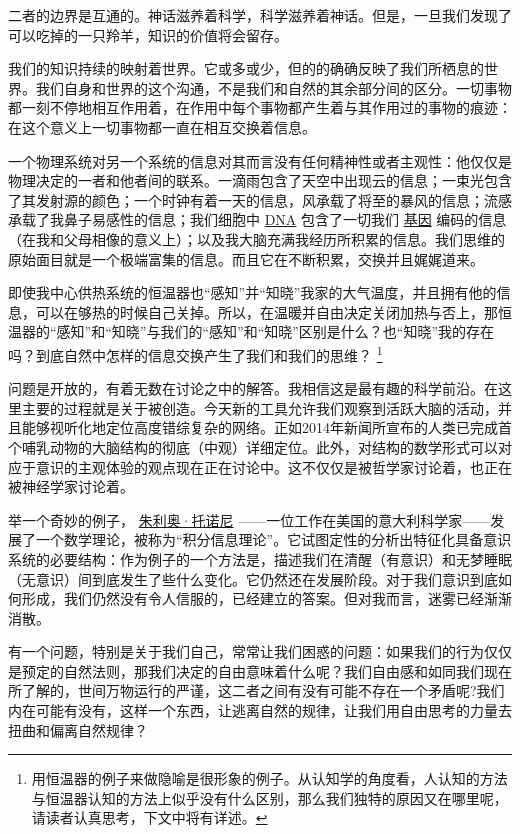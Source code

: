     二者的边界是互通的。神话滋养着科学，科学滋养着神话。但是，一旦我们发现了可以吃掉的一只羚羊，知识的价值将会留存。

    我们的知识持续的映射着世界。它或多或少，但的的确确反映了我们所栖息的世界。我们自身和世界的这个沟通，不是我们和自然的其余部分间的区分。一切事物都一刻不停地相互作用着，在作用中每个事物都产生着与其作用过的事物的痕迹：在这个意义上一切事物都一直在相互交换着信息。

    一个物理系统对另一个系统的信息对其而言没有任何精神性或者主观性：他仅仅是物理决定的一者和他者间的联系。一滴雨包含了天空中出现云的信息；一束光包含了其发射源的颜色；一个时钟有着一天的信息，风承载了将至的暴风的信息；流感承载了我鼻子易感性的信息；我们细胞中
\href{http://toyhouse.cc/wiki/index.php/DNA}{DNA}
包含了一切我们
\href{http://toyhouse.cc/wiki/index.php/基因}{基因}
编码的信息（在我和父母相像的意义上）；以及我大脑充满我经历所积累的信息。我们思维的原始面目就是一个极端富集的信息。而且它在不断积累，交换并且娓娓道来。
 
   即使我中心供热系统的恒温器也“感知”并“知晓”我家的大气温度，并且拥有他的信息，可以在够热的时候自己关掉。所以，在温暖并自由决定关闭加热与否上，那恒温器的“感知”和“知晓”与我们的“感知”和“知晓”区别是什么？也“知晓”我的存在吗？到底自然中怎样的信息交换产生了我们和我们的思维？
\footnote[4]
{
用恒温器的例子来做隐喻是很形象的例子。从认知学的角度看，人认知的方法与恒温器认知的方法上似乎没有什么区别，那么我们独特的原因又在哪里呢，请读者认真思考，下文中将有详述。
}

    问题是开放的，有着无数在讨论之中的解答。我相信这是最有趣的科学前沿。在这里主要的过程就是关于被创造。今天新的工具允许我们观察到活跃大脑的活动，并且能够视听化地定位高度错综复杂的网络。正如2014年新闻所宣布的人类已完成首个哺乳动物的大脑结构的彻底（中观）详细定位。此外，对结构的数学形式可以对应于意识的主观体验的观点现在正在讨论中。这不仅仅是被哲学家讨论着，也正在被神经学家讨论着。

    举一个奇妙的例子，
\href{http://toyhouse.cc/wiki/index.php/朱利奥·托诺尼}{朱利奥·托诺尼}
——一位工作在美国的意大利科学家——发展了一个数学理论，被称为“积分信息理论”。它试图定性的分析出特征化具备意识系统的必要结构：作为例子的一个方法是，描述我们在清醒（有意识）和无梦睡眠（无意识）间到底发生了些什么变化。它仍然还在发展阶段。对于我们意识到底如何形成，我们仍然没有令人信服的，已经建立的答案。但对我而言，迷雾已经渐渐消散。

    有一个问题，特别是关于我们自己，常常让我们困惑的问题：如果我们的行为仅仅是预定的自然法则，那我们决定的自由意味着什么呢？我们自由感和如同我们现在所了解的，世间万物运行的严谨，这二者之间有没有可能不存在一个矛盾呢?我们内在可能有没有，这样一个东西，让逃离自然的规律，让我们用自由思考的力量去扭曲和偏离自然规律？


